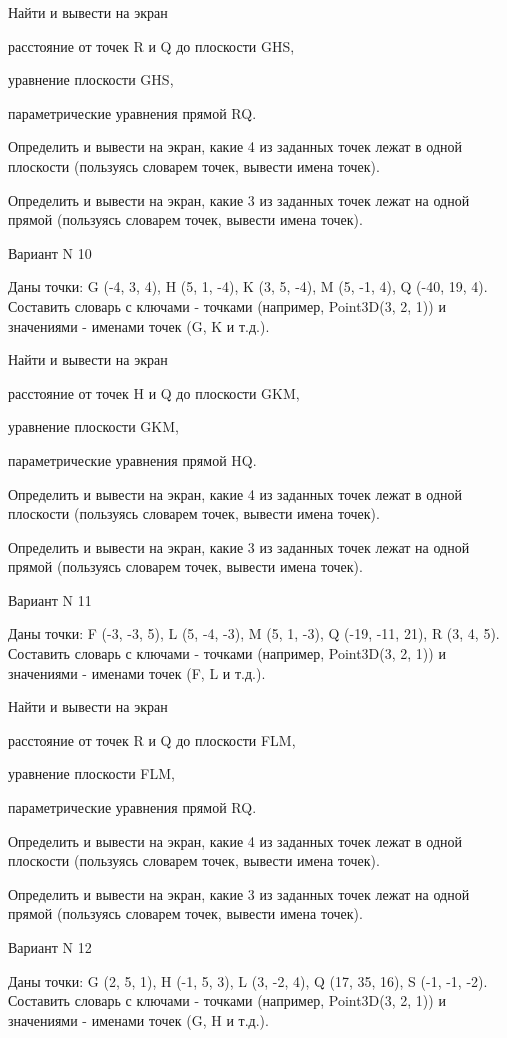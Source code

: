 \documentclass[11pt]{report}
\begin{document}
Найти и вывести на экран


расстояние от точек R и Q до плоскости GHS,


уравнение плоскости GHS,


параметрические уравнения прямой RQ.


Определить и вывести на экран, какие 4 из заданных точек лежат в одной плоскости (пользуясь словарем точек, вывести имена точек).


Определить и вывести на экран, какие 3 из заданных точек лежат на одной прямой (пользуясь словарем точек, вывести имена точек).

\newpage
Вариант N 10

Даны точки: G (-4, 3, 4), H (5, 1, -4), K (3, 5, -4), M (5, -1, 4), Q (-40, 19, 4).
Составить словарь с ключами - точками (например, Point3D(3, 2, 1)) и значениями - именами точек (G, K и т.д.).


Найти и вывести на экран


расстояние от точек H и Q до плоскости GKM,


уравнение плоскости GKM,


параметрические уравнения прямой HQ.


Определить и вывести на экран, какие 4 из заданных точек лежат в одной плоскости (пользуясь словарем точек, вывести имена точек).


Определить и вывести на экран, какие 3 из заданных точек лежат на одной прямой (пользуясь словарем точек, вывести имена точек).

\newpage
Вариант N 11

Даны точки: F (-3, -3, 5), L (5, -4, -3), M (5, 1, -3), Q (-19, -11, 21), R (3, 4, 5).
Составить словарь с ключами - точками (например, Point3D(3, 2, 1)) и значениями - именами точек (F, L и т.д.).


Найти и вывести на экран


расстояние от точек R и Q до плоскости FLM,


уравнение плоскости FLM,


параметрические уравнения прямой RQ.


Определить и вывести на экран, какие 4 из заданных точек лежат в одной плоскости (пользуясь словарем точек, вывести имена точек).


Определить и вывести на экран, какие 3 из заданных точек лежат на одной прямой (пользуясь словарем точек, вывести имена точек).

\newpage
Вариант N 12

Даны точки: G (2, 5, 1), H (-1, 5, 3), L (3, -2, 4), Q (17, 35, 16), S (-1, -1, -2).
Составить словарь с ключами - точками (например, Point3D(3, 2, 1)) и значениями - именами точек (G, H и т.д.).
\end{document}
